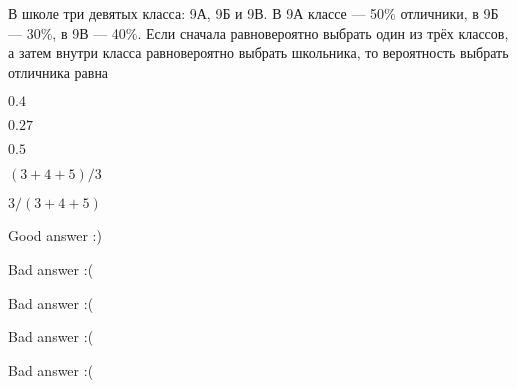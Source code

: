 
\begin{question}
В школе три девятых класса: 9А, 9Б и 9В. В 9А классе --- 50\% отличники,
в 9Б --- 30\%, в 9В --- 40\%. Если сначала равновероятно выбрать один из
трёх классов, а затем внутри класса равновероятно выбрать школьника, то
вероятность выбрать отличника равна
\begin{answerlist}
  \item \(0.4\)
  \item \(0.27\)
  \item \(0.5\)
  \item \((3+4+5)/3\)
  \item \(3/(3+4+5)\)
\end{answerlist}
\end{question}

\begin{solution}
\begin{answerlist}
  \item Good answer :)
  \item Bad answer :(
  \item Bad answer :(
  \item Bad answer :(
  \item Bad answer :(
\end{answerlist}
\end{solution}

